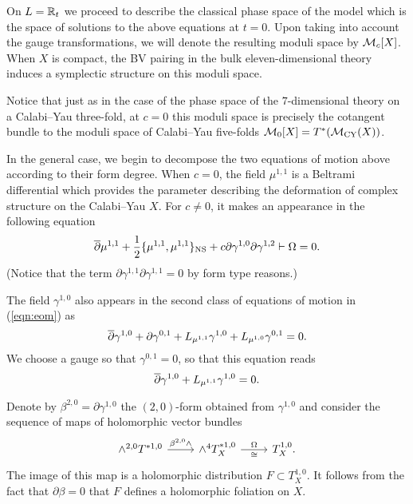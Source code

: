 \documentclass[11pt]{amsart}
\begin{document}
On $L = \mathbb R_t$ we proceed to describe the classical phase space of the model  which is the space of solutions to the above equations at $t = 0$.
Upon taking into account the gauge transformations, we will denote the resulting moduli space by $\mathcal M_c[X]$.
When $X$ is compact, the BV pairing in the bulk eleven-dimensional theory induces a symplectic structure on this moduli space.

Notice that just as in the case of the phase space of the $7$-dimensional theory on a Calabi--Yau three-fold, at $c=0$ this moduli space is precisely the cotangent bundle to the moduli space of Calabi--Yau five-folds $\mathcal M_0 [X] = T^*(\mathcal M_{\rm CY}(X))$.

In the general case, we begin to decompose the two equations of motion above according to their form degree.
When $c = 0$, the field $\mu^{1,1}$ is a Beltrami differential which provides the parameter describing the deformation of complex structure on the Calabi--Yau $X$.
For $c \ne 0$, it makes an appearance in the following equation
\begin{equation}\label{eqn:mu11}
  \overline{\partial} \mu^{1,1} + \frac12 \{\mu^{1,1}, \mu^{1,1}\}_{\rm NS} + c \partial \gamma^{1,0} \partial \gamma^{1,2} \vdash \Omega = 0 .
\end{equation}
(Notice that the term $\partial \gamma^{1,1} \partial \gamma^{1,1} = 0$ by form type reasons.)

The field $\gamma^{1,0}$ also appears in the second class of equations of motion in (\ref{eqn:eom}) as
\[
  \overline{\partial} \gamma^{1,0} + \partial \gamma^{0,1} + L_{\mu^{1,1}} \gamma^{1,0} + L_{\mu^{1,0}} \gamma^{0,1} = 0 .
\]
We choose a gauge so that $\gamma^{0,1} = 0$,  so that this equation reads
\begin{equation}\label{eqn:gamma10}
  \overline{\partial} \gamma^{1,0} + L_{\mu^{1,1}} \gamma^{1,0} = 0 .
\end{equation}

Denote by $\beta^{2,0} = \partial \gamma^{1,0}$ the $(2,0)$-form obtained from $\gamma^{1,0}$ and consider the sequence of maps of holomorphic vector bundles
\[
  \begin{tikzcd}
    \wedge^{2,0} T^{*1,0} \ar[r, "\beta^{2,0} \wedge"] & \wedge^4 T_X^{*1,0} \ar[r, "\Omega", "\cong"'] & T^{1,0}_X .
  \end{tikzcd}
\]
The image of this map is a holomorphic distribution $F \subset T_X^{1,0}$.
It follows from the fact that $\partial \beta = 0$ that $F$ defines a holomorphic foliation on $X$.
\end{document}
